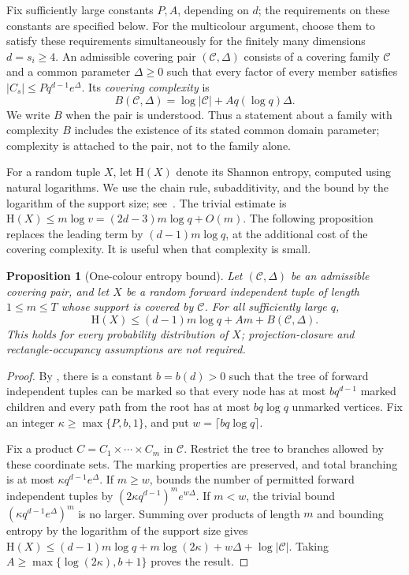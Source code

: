 \documentclass[11pt,a4paper]{article}
\numberwithin{equation}{section}
\newtheorem{proposition}[theorem]{Proposition}
\newcommand{\HH}{\mathrm H}
\newcommand{\cC}{\mathcal C}
\begin{document}
Fix sufficiently large constants $P,A$, depending on $d$; the requirements
on these constants are specified below. For the multicolour argument,
choose them to satisfy these requirements simultaneously for the
finitely many dimensions $d=s_i\ge4$.
An admissible covering pair $(\cC,\Delta)$ consists of a covering
family $\cC$ and a common parameter $\Delta\ge0$ such that every
factor of every member satisfies $|C_s|\le Pq^{d-1}e^\Delta$.
Its \emph{covering complexity} is
\begin{equation}\label{eq:domains}
 B(\cC,\Delta)=\log|\cC|+Aq(\log q)\Delta.
\end{equation}
We write $B$ when the pair is understood.
Thus a statement about a family with complexity $B$ includes the
existence of its stated common domain parameter; complexity is
attached to the pair, not to the family alone.

For a random tuple $X$, let $\HH(X)$ denote its Shannon entropy,
computed using natural logarithms. We use the chain rule,
subadditivity, and the bound by the logarithm of the support size;
see~\cite[Chapter~2]{CT}.
The trivial estimate is $\HH(X)\le m\log v=(2d-3)m\log q+O(m)$.
The following proposition replaces the leading term by
$(d-1)m\log q$, at the additional cost of the covering complexity.
It is useful when that complexity is small.

\begin{proposition}[One-colour entropy bound]\label{prop:entropy}
Let $(\cC,\Delta)$ be an admissible covering pair, and let $X$
be a random forward independent tuple of length $1\le m\le T$
whose support is covered by $\cC$.
For all sufficiently large $q$,
\begin{equation}\label{eq:entropy-upper}
 \HH(X)\le(d-1)m\log q+Am+B(\cC,\Delta).
\end{equation}
This holds for every probability distribution of $X$;
projection-closure and rectangle-occupancy assumptions are not required.
\end{proposition}

\begin{proof}
By \cite[Claim~2.13, with parameter $d-1$]{Bradac}, there is a
constant $b=b(d)>0$ such that the tree of forward independent
tuples can be marked so that every node has at most $bq^{d-1}$ marked
children and every path from the root has at most $bq\log q$
unmarked vertices. Fix an integer $\kappa\ge\max\{P,b,1\}$,
and put $w=\lceil bq\log q\rceil$.

Fix a product $C=C_1\times\cdots\times C_m$ in $\cC$.
Restrict the tree to branches allowed by these coordinate sets.
The marking properties are preserved, and total branching is at
most $\kappa q^{d-1}e^\Delta$.
If $m\ge w$, \cite[Lemma~2.7]{Bradac} bounds the number of
permitted forward independent tuples by
$(2\kappa q^{d-1})^m e^{w\Delta}$.
If $m<w$, the trivial bound $(\kappa q^{d-1}e^\Delta)^m$ is no larger.
Summing over products of length $m$ and bounding entropy by the
logarithm of the support size gives
$\HH(X)\le(d-1)m\log q+m\log(2\kappa)+w\Delta+\log|\cC|$.
Taking $A\ge\max\{\log(2\kappa),b+1\}$ proves the result.
\end{proof}
\end{document}
